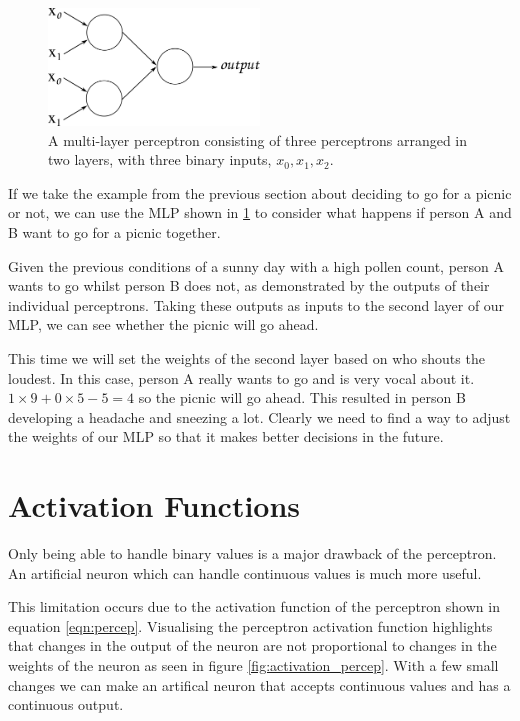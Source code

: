 \begin{figure}
	\centering
	\includegraphics[width=0.5\textwidth]{Figs/intro2dl/mlp.png}
	
	\caption{A multi-layer perceptron consisting of three perceptrons arranged in two layers, with three binary inputs, $x_0, x_1, x_2$.}
	\label{fig:mlp}
\end{figure}

If we take the example from the previous section about deciding to go for a picnic or not, we can use the MLP shown in \ref{fig:mlp} to consider what happens if person A and B want to go for a picnic together.

Given the previous conditions of a sunny day with a high pollen count, person A wants to go whilst person B does not, as demonstrated by the outputs of their individual perceptrons. Taking these outputs as inputs to the second layer of our MLP, we can see whether the picnic will go ahead.

This time we will set the weights of the second layer based on who shouts the loudest. In this case, person A really wants to go and is very vocal about it. $1 \times 9 + 0 \times 5 - 5 = 4$ so the picnic will go ahead. This resulted in person B developing a headache and sneezing a lot. Clearly we need to find a way to adjust the weights of our MLP so that it makes better decisions in the future.

\section{Activation Functions}

Only being able to handle binary values is a major drawback of the perceptron. An artificial neuron which can handle continuous values is much more useful.

This limitation occurs due to the activation function of the perceptron shown in equation \ref{eqn:percep}. Visualising the perceptron activation function highlights that changes in the output of the neuron are not proportional to changes in the weights of the neuron as seen in figure \ref{fig:activation_percep}. With a few small changes we can make an artifical neuron that accepts continuous values and has a continuous output.

